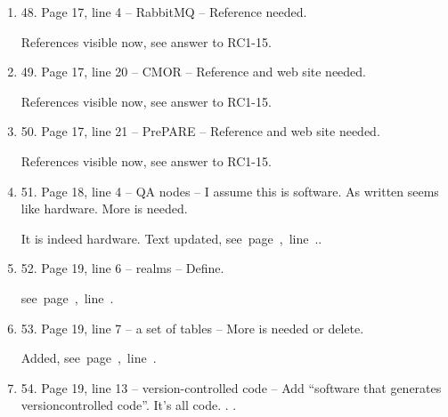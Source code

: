 \documentclass[gmd,manuscript]{copernicus}
\newcommand{\plref}[1]{\mbox{see page \pageref{p-#1}, line
    \lineref{l-#1}.}}
\newenvironment{answer}{\color{blue}}{}
\begin{document}
\begin{enumerate}[label=RC1-\arabic*,leftmargin=*]
  \begin{answer}
    Indeed, a list of PIDs could be very long. In general, journals
    (including even leading ones such as \emph{Science} do not count
    supplementary material against page count limits or costs, nor do
    they include them in print versions, so the length should not be
    an issue.

    If the reviewer is asking if the WIP is providing software for
    this purpose, the answer is no. But as the PIDs are in the netCDF
    files, it cannot be seen as difficult for scientists to harvest
    them from the files they use in their research.

    Text unchanged.
  \end{answer}
\item 48. Page 17, line 4 -- RabbitMQ -- Reference needed.

  \begin{answer}
    References visible now, see answer to RC1-15.
  \end{answer}
\item 49. Page 17, line 20 -- CMOR -- Reference and web site needed.

  \begin{answer}
    References visible now, see answer to RC1-15.
  \end{answer}
\item 50. Page 17, line 21 -- PrePARE -- Reference and web site needed.

  \begin{answer}
    References visible now, see answer to RC1-15.
  \end{answer}
\item 51. Page 18, line 4 -- QA nodes -- I assume this is software. As
  written seems like hardware. More is needed.

  \begin{answer}
    It is indeed hardware. Text updated, \plref{RC1-51}.
  \end{answer}
\item 52. Page 19, line 6 -- realms -- Define.

  \begin{answer}
    \plref{RC1-52}
  \end{answer}
\item 53. Page 19, line 7 -- a set of tables -- More is needed or
  delete.

  \begin{answer}
    Added, \plref{RC1-53}
  \end{answer}
\item 54. Page 19, line 13 -- version-controlled code -- Add “software
  that generates versioncontrolled code”. It’s all code. . .


\end{enumerate}
\end{document}
